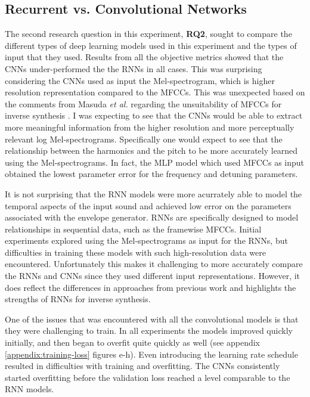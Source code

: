 \subsection{Recurrent vs. Convolutional Networks}
The second research question in this experiment, \textbf{RQ2}, sought to compare the different types of deep learning models used in this experiment and the types of input that they used. Results from all the objective metrics showed that the CNNs under-performed the the RNNs in all cases. This was surprising considering the CNNs used as input the Mel-spectrogram, which is higher resolution representation compared to the MFCCs. This was unexpected based on the comments from Masuda \textit{et al.} regarding the unsuitability of MFCCs for inverse synthesis \cite{masudo2021quality}. I was expecting to see that the CNNs would be able to extract more meaningful information from the higher resolution and more perceptually relevant log Mel-spectrograms. Specifically one would expect to see that the relationship between the harmonics and the pitch to be more accurately learned using the Mel-spectrograms. In fact, the MLP model which used MFCCs as input obtained the lowest parameter error for the frequency and detuning parameters.

It is not surprising that the RNN models were more acurrately able to model the temporal aspects of the input sound and achieved low error on the parameters associated with the envelope generator. RNNs are specifically designed to model relationships in sequential data, such as the framewise MFCCs. Initial experiments explored using the Mel-spectrograms as input for the RNNs, but difficulties in training these models with such high-resolution data were encountered. Unfortunately this makes it challenging to more accurately compare the RNNs and CNNs since they used different input representations. However, it does reflect the differences in approaches from previous work and highlights the strengths of RNNs for inverse synthesis.

One of the issues that was encountered with all the convolutional models is that they were challenging to train. In all experiments the models improved quickly initially, and then began to overfit quite quickly as well (see appendix \ref{appendix:training-loss} figures e-h). Even introducing the learning rate schedule resulted in difficulties with training and overfitting. The CNNs consistently started overfitting before the validation loss reached a level comparable to the RNN models.

